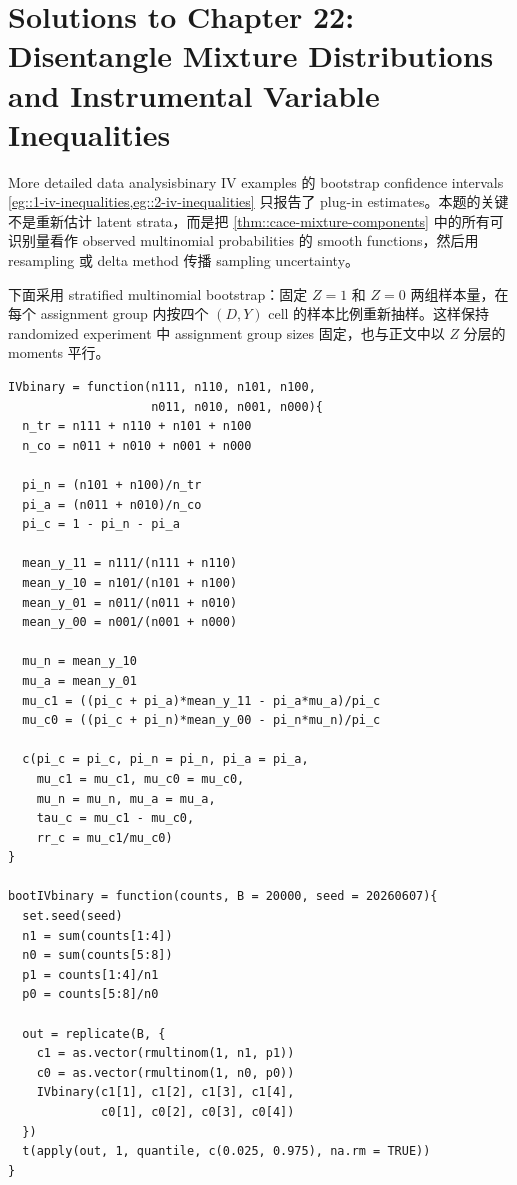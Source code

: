 \chapter{Solutions to Chapter 22: Disentangle Mixture Distributions and Instrumental Variable Inequalities}
\label{sol:chapter22}

\begin{exercisesolution}{More detailed data analysis}{binary IV examples 的 bootstrap confidence intervals}
\cref{eg::1-iv-inequalities,eg::2-iv-inequalities} 只报告了 plug-in estimates。本题的关键不是重新估计 latent strata，而是把 \cref{thm::cace-mixture-components} 中的所有可识别量看作 observed multinomial probabilities 的 smooth functions，然后用 resampling 或 delta method 传播 sampling uncertainty。

下面采用 stratified multinomial bootstrap：固定 $Z=1$ 和 $Z=0$ 两组样本量，在每个 assignment group 内按四个 $(D,Y)$ cell 的样本比例重新抽样。这样保持 randomized experiment 中 assignment group sizes 固定，也与正文中以 $Z$ 分层的 moments 平行。

\begin{lstlisting}
IVbinary = function(n111, n110, n101, n100,
                    n011, n010, n001, n000){
  n_tr = n111 + n110 + n101 + n100
  n_co = n011 + n010 + n001 + n000

  pi_n = (n101 + n100)/n_tr
  pi_a = (n011 + n010)/n_co
  pi_c = 1 - pi_n - pi_a

  mean_y_11 = n111/(n111 + n110)
  mean_y_10 = n101/(n101 + n100)
  mean_y_01 = n011/(n011 + n010)
  mean_y_00 = n001/(n001 + n000)

  mu_n = mean_y_10
  mu_a = mean_y_01
  mu_c1 = ((pi_c + pi_a)*mean_y_11 - pi_a*mu_a)/pi_c
  mu_c0 = ((pi_c + pi_n)*mean_y_00 - pi_n*mu_n)/pi_c

  c(pi_c = pi_c, pi_n = pi_n, pi_a = pi_a,
    mu_c1 = mu_c1, mu_c0 = mu_c0,
    mu_n = mu_n, mu_a = mu_a,
    tau_c = mu_c1 - mu_c0,
    rr_c = mu_c1/mu_c0)
}

bootIVbinary = function(counts, B = 20000, seed = 20260607){
  set.seed(seed)
  n1 = sum(counts[1:4])
  n0 = sum(counts[5:8])
  p1 = counts[1:4]/n1
  p0 = counts[5:8]/n0

  out = replicate(B, {
    c1 = as.vector(rmultinom(1, n1, p1))
    c0 = as.vector(rmultinom(1, n0, p0))
    IVbinary(c1[1], c1[2], c1[3], c1[4],
             c0[1], c0[2], c0[3], c0[4])
  })
  t(apply(out, 1, quantile, c(0.025, 0.975), na.rm = TRUE))
}
\end{lstlisting}


\end{exercisesolution}
